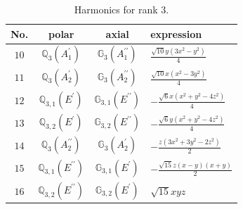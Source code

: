 \documentclass[fleqn,8pt,landscape]{jsarticle}
\begin{document}
\begin{table}[ht!]
\begin{center}
\caption{Harmonics for rank 3.}
\renewcommand{\arraystretch}{1.3}
\begin{tabular}{cccl} \hline \hline
No. & polar & axial & expression \\ \hline
$ 10 $ & $ \mathbb{Q}_{3}(A_{1}^{\prime}) $ & $ \mathbb{G}_{3}(A_{1}^{\prime\prime}) $ & $ \frac{\sqrt{10} y \left(3 x^{2} - y^{2}\right)}{4} $ \\
$ 11 $ & $ \mathbb{Q}_{3}(A_{2}^{\prime}) $ & $ \mathbb{G}_{3}(A_{2}^{\prime\prime}) $ & $ \frac{\sqrt{10} x \left(x^{2} - 3 y^{2}\right)}{4} $ \\
$ 12 $ & $ \mathbb{Q}_{3,1}(E^{\prime}) $ & $ \mathbb{G}_{3,1}(E^{\prime\prime}) $ & $ - \frac{\sqrt{6} x \left(x^{2} + y^{2} - 4 z^{2}\right)}{4} $ \\
$ 13 $ & $ \mathbb{Q}_{3,2}(E^{\prime}) $ & $ \mathbb{G}_{3,2}(E^{\prime\prime}) $ & $ - \frac{\sqrt{6} y \left(x^{2} + y^{2} - 4 z^{2}\right)}{4} $ \\
$ 14 $ & $ \mathbb{Q}_{3}(A_{2}^{\prime\prime}) $ & $ \mathbb{G}_{3}(A_{2}^{\prime}) $ & $ - \frac{z \left(3 x^{2} + 3 y^{2} - 2 z^{2}\right)}{2} $ \\
$ 15 $ & $ \mathbb{Q}_{3,1}(E^{\prime\prime}) $ & $ \mathbb{G}_{3,1}(E^{\prime}) $ & $ - \frac{\sqrt{15} z \left(x - y\right) \left(x + y\right)}{2} $ \\
$ 16 $ & $ \mathbb{Q}_{3,2}(E^{\prime\prime}) $ & $ \mathbb{G}_{3,2}(E^{\prime}) $ & $ \sqrt{15} x y z $ \\
 \hline \hline
\end{tabular}
\end{center}
\end{table}
\end{document}
